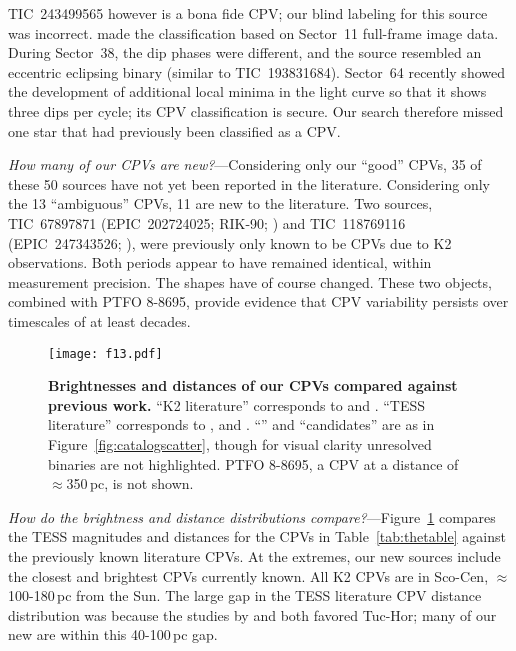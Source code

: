 \documentclass[11pt,twocolumn,tighten]{aastex63}
\begin{document}
TIC~243499565 however is a bona fide CPV; our blind labeling for this
source was incorrect.  \citet{2021AJ....161...60S} made the
classification based on Sector~11 full-frame image data.  During
Sector~38, the dip phases were different, and the source
resembled an eccentric eclipsing binary (similar to TIC~193831684).  Sector~64 recently showed
the development of additional local minima in the light curve so that
it shows three dips per cycle; its CPV classification is secure.  Our
search therefore missed one star that had previously been classified
as a CPV.

{\it How many of our CPVs are new?}---Considering only our ``good''
CPVs, 35 of these 50 sources have not yet been reported in the
literature.  Considering only the 13 ``ambiguous'' CPVs, 11 are new to
the literature.  Two sources, TIC~67897871 (EPIC~202724025; RIK-90;
\citealt{2017AJ....153..152S}) and TIC~118769116 (EPIC~247343526;
\citealt{2017AJ....153..152S}), were previously only known to be CPVs
due to K2 observations.  Both periods appear to have remained
identical, within measurement precision.  The shapes have of course changed.
These two objects, combined with PTFO 8-8695, provide evidence
that CPV variability persists over timescales of at least decades.


\begin{figure}[!t]
	\begin{center}
		\centering
		\texttt{[image: f13.pdf]}
		\vspace{-0.2cm}
		\caption{
			{\bf Brightnesses and distances of our CPVs compared
      against previous work.}  
      ``K2 literature'' corresponds to \citet{2017AJ....153..152S} and
      \citet{2018AJ....155...63S}.  ``TESS literature'' corresponds to
      \citet{2019ApJ...876..127Z,2021AJ....161...60S,2022AJ....163..144G}, and \citet{2023ApJ...945..114P}.
      ``'' and ``candidates'' are as in
      Figure~\ref{fig:catalogscatter}, though for visual clarity
      unresolved binaries are not highlighted.  PTFO 8-8695, a CPV at
      a distance of $\approx$350\,pc, is not shown.
		}
			\vspace{-0.5cm}
		\label{fig:tmagvsdist}
	\end{center}
\end{figure}



{\it How do the brightness and distance distributions
compare?}---Figure~\ref{fig:tmagvsdist} compares the TESS magnitudes
and distances for the CPVs in Table~\ref{tab:thetable} against the
previously known literature CPVs.  At the extremes, our new sources
include the closest and brightest CPVs currently known. 
All K2 CPVs are in Sco-Cen,
$\approx$100-180\,pc from the Sun.  The large gap in the TESS literature CPV
distance distribution was because the studies by
\citep{2019ApJ...876..127Z} and \citet{2023ApJ...945..114P} both
favored Tuc-Hor; many of our new  are within this 40-100\,pc gap.
\end{document}
